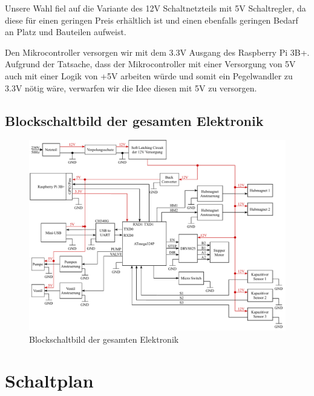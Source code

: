 Unsere Wahl fiel auf die Variante des 12V Schaltnetzteils mit 5V Schaltregler, da diese für einen geringen Preis erhältlich ist
und einen ebenfalls geringen Bedarf an Platz und Bauteilen aufweist.

Den Mikrocontroller versorgen wir mit dem 3.3V Ausgang des Raspberry Pi 3B+.
Aufgrund der Tatsache, dass der Mikrocontroller mit einer Versorgung von 5V auch mit einer Logik von +5V arbeiten würde und somit ein Pegelwandler zu 3.3V nötig wäre,
verwarfen wir die Idee diesen mit 5V zu versorgen.

\newpage

\subsection{Blockschaltbild der gesamten Elektronik}

\begin{figure}[hb]
    \centering
    \includegraphics[scale=0.85,page=1]{fig/elektro/ElectroBlockDiagram.pdf}
    \caption{Blockschaltbild der gesamten Elektronik}\label{fig:Blockschaltbild}
\end{figure}

\newpage


\section{Schaltplan}

